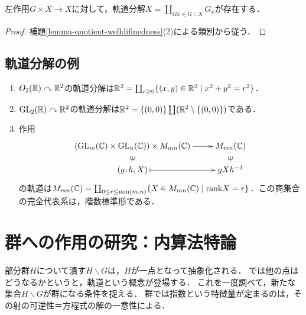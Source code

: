 \documentclass[uplatex,dvipdfmx]{jsreport}
\begin{document}
\begin{theorem}[軌道分解]\label{thm-orbit-decomposition}
    左作用$G\times X\to X$に対して，軌道分解$X=\coprod_{Gx\in G\backslash X}G_x$が存在する．
\end{theorem}
\begin{proof}
    補題\ref{lemma-quotient-welldifinedness}(2)による類別から従う．
\end{proof}

\subsection{軌道分解の例}

\begin{example}\mbox{}
    \begin{enumerate}
        \item $O_2(\mathbb{R})\curvearrowright\mathbb{R}^2$の軌道分解は$\mathbb{R}^2=\coprod_{r\ge 0}\{(x,y)\in\mathbb{R}^2\mid x^2+y^2=r^2\}$．
        \item $\mathrm{GL}_2(\mathbb{R})\curvearrowright\mathbb{R}^2$の軌道分解は$\mathbb{R}^2=\{(0,0)\}\coprod(\mathbb{R}^2\setminus\{(0,0)\})$である．
        \item 作用
        \[\xymatrix@R-2pc{
            (\GL_m(\C)\times\GL_n(\C))\times M_{mn}(\C)\ar[r]&M_{mn}(\C)\\
            \rotatebox[origin=c]{90}{$\in$}&\rotatebox[origin=c]{90}{$\in$}\\
            (g,h,X)\ar@{|->}[r]&gXh^{-1}
        }\]
        の軌道は$M_{mn}(\mathbb{C})=\coprod_{0\le r\le\min(m,n)}\{X\in M_{mn}(\mathbb{C})\mid \mathrm{rank} X=r\}$．この商集合の完全代表系は，階数標準形である．
    \end{enumerate}
\end{example}

\section{群への作用の研究：内算法特論}

\begin{tcolorbox}[colframe=ForestGreen, colback=ForestGreen!10!white,breakable,colbacktitle=ForestGreen!40!white,coltitle=black,fonttitle=\bfseries\sffamily,
title=半直積同様，自己言及させた時が一番深い]
    部分群$H$について潰す$H\backslash G$は，$H$が一点となって抽象化される．
    では他の点はどうなるかというと，軌道という概念が登場する．
    これを一度調べて，新たな集合$H\backslash G$が群になる条件を捉える．
    群では指数という特徴量が定まるのは，その射の可逆性＝方程式の解の一意性による．
\end{tcolorbox}
\end{document}
